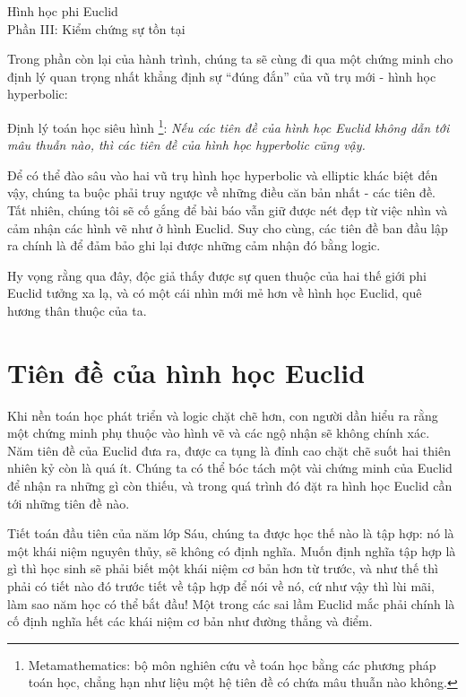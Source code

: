 {Hình học phi Euclid\\
Phần III: Kiểm chứng sự tồn tại}

Trong phần còn lại của hành trình, chúng ta sẽ cùng đi qua một chứng minh cho định lý quan trọng nhất khẳng định sự ``đúng đắn'' của vũ trụ mới - hình học hyperbolic:

Định lý toán học siêu hình
\footnote{Metamathematics: bộ môn nghiên cứu về toán học bằng các phương pháp toán học, chẳng hạn như liệu một hệ tiên đề có chứa mâu thuẫn nào không.}: \textit{Nếu các tiên đề của hình học Euclid không dẫn tới mâu thuẫn nào, thì các tiên đề của hình học hyperbolic cũng vậy. }



Để có thể đào sâu vào hai vũ trụ hình học hyperbolic và elliptic khác biệt đến vậy, chúng ta buộc phải truy ngược về những điều căn bản nhất - các tiên đề. Tất nhiên, chúng tôi sẽ cố gắng để bài báo vẫn giữ được nét đẹp từ việc nhìn và cảm nhận các hình vẽ như ở hình Euclid. Suy cho cùng, các tiên đề ban đầu lập ra chính là để đảm bảo ghi lại được những cảm nhận đó bằng logic. 

Hy vọng rằng qua đây, độc giả thấy được sự quen thuộc của hai thế giới phi Euclid tưởng xa lạ, và có một cái nhìn mới mẻ hơn về hình học Euclid, quê hương thân thuộc của ta.

\section{Tiên đề của hình học Euclid}

Khi nền toán học phát triển và logic chặt chẽ hơn, con người dần hiểu ra rằng một chứng minh phụ thuộc vào hình vẽ và các ngộ nhận sẽ không chính xác. Năm tiên đề của Euclid đưa ra, được ca tụng là đỉnh cao chặt chẽ suốt hai thiên nhiên kỷ còn là quá ít. Chúng ta có thể bóc tách một vài chứng minh của Euclid để nhận ra những gì còn thiếu, và trong quá trình đó đặt ra hình học Euclid cần tới những tiên đề nào. 

Tiết toán đầu tiên của năm lớp Sáu,  chúng ta  được học thế nào là tập hợp: nó là một khái niệm nguyên thủy, sẽ không có định nghĩa. Muốn định nghĩa tập hợp là gì thì học sinh sẽ phải biết một khái niệm cơ bản hơn từ trước, và như thế thì phải có tiết nào đó trước tiết về tập hợp để nói về nó, cứ như vậy thì lùi mãi, làm sao năm học có thể bắt đầu! Một trong các sai lầm Euclid mắc phải chính là cố định nghĩa hết các khái niệm cơ bản như đường thẳng và điểm.
	
	
	 
